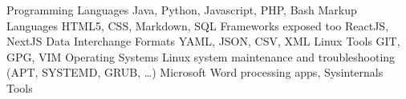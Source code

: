 \documentclass[]{awesome-cv}
\begin{document}
\begin{cvskills}
  \cvskill
    {Programming Languages} %
    {Java, Python, Javascript, PHP, Bash} %
  \cvskill
    {Markup Languages} %
    {HTML5, CSS, Markdown, SQL} %
  \cvskill
    {Frameworks exposed too} %
    {ReactJS, NextJS} %
  \cvskill
    {Data Interchange Formats} %
    {YAML, JSON, CSV, XML} %
  \cvskill
    {Linux Tools} %
    {GIT, GPG, VIM} %
  \cvskill
    {Operating Systems} %
    {Linux system maintenance and troubleshooting (APT, SYSTEMD, GRUB, \ldots)} %
  \cvskill
    {Microsoft} %
    {Word processing apps, Sysinternals Tools} %
\end{cvskills}


\end{document}
